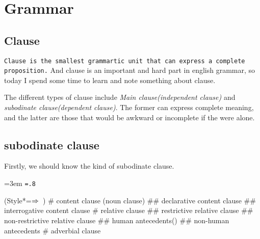 \chapter{Grammar}

\section{Clause}

{\tt Clause is the smallest grammartic unit that can express a complete proposition.}
And clause is an important and hard part in english grammar, so today I spend some
time to learn and note something about clause.

The different types of clause include \emph{Main clause(independent clause)} and 
\emph{subodinate clause(dependent clause)}.
The former can express complete meaning, and the latter are those that would be
awkward or incomplete if the were alone.

\section{subodinate clause}

Firstly, we should know the kind of subodinate clause.\par
{\leftskip=3em \medskip \tt \baselineskip=.8\baselineskip
\begin{easylist}[checklist]
\ListProperties(Style*=$\Rightarrow\hskip.5em$)
# content clause (noun clause)
## declarative content clause
## interrogative content clause
# relative clause
## restrictive relative clause
## non-restrictive relative clause
## human antecedents()
## non-human antecedents
# adverbial clause
\end{easylist}
}